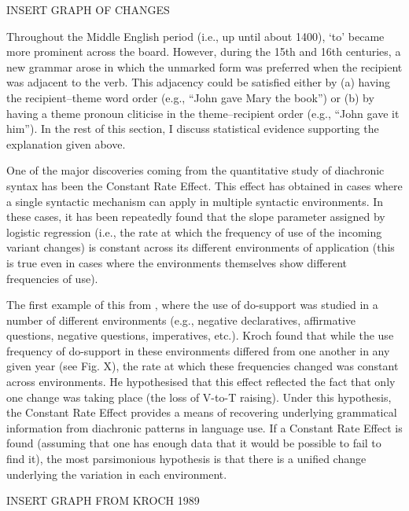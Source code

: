INSERT GRAPH OF CHANGES

	Throughout the Middle English period (i.e., up until about 1400), `to' became more prominent across the board. However, during the 15th and 16th centuries, a new grammar arose in which the unmarked form was preferred when the recipient was adjacent to the verb. This adjacency could be satisfied either by (a) having the recipient--theme word order (e.g., ``John gave Mary the book'') or (b) by having a theme pronoun cliticise in the theme--recipient order (e.g., ``John gave it him''). In the rest of this section, I discuss statistical evidence supporting the explanation given above.

	One of the major discoveries coming from the quantitative study of diachronic syntax has been the Constant Rate Effect. This effect has obtained in cases where a single syntactic mechanism can apply in multiple syntactic environments. In these cases, it has been repeatedly found that the slope parameter assigned by logistic regression (i.e., the rate at which the frequency of use of the incoming variant changes) is constant across its different environments of application (this is true even in cases where the environments themselves show different frequencies of use). 

	The first example of this from \cite{Kroch.1989}, where the use of do-support was studied in a number of different environments (e.g., negative declaratives, affirmative questions, negative questions, imperatives, etc.). Kroch found that while the use frequency of do-support in these environments differed from one another in any given year (see Fig. X), the rate at which these frequencies changed was constant across environments. He hypothesised that this effect reflected the fact that only one change was taking place (the loss of V-to-T raising). Under this hypothesis, the Constant Rate Effect provides a means of recovering underlying grammatical information from diachronic patterns in language use. If a Constant Rate Effect is found (assuming that one has enough data that it would be possible to fail to find it), the most parsimonious hypothesis is that there is a unified change underlying the variation in each environment.

	INSERT GRAPH FROM KROCH 1989

